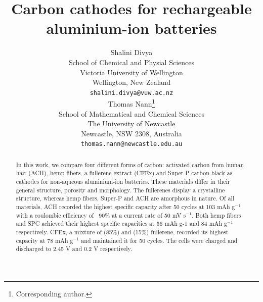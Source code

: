 \documentclass{article}
\title{Carbon cathodes for rechargeable aluminium-ion batteries}
\author{
  Shalini Divya\\
  School of Chemical and Physial Sciences\\
  Victoria University of Wellington\\
  Wellington, New Zealand\\
  \texttt{shalini.divya@vuw.ac.nz}\\
   \And
  Thomas Nann\thanks{Corresponding author.}\\
  School of Mathematical and Chemical Sciences\\
  The University of Newcastle\\
  Newcastle, NSW 2308, Australia\\
  \texttt{thomas.nann@newcastle.edu.au}\\
}
\begin{document}
\maketitle
\begin{abstract}
 In this work, we compare four different forms of carbon: activated carbon from human hair (ACH), hemp fibers, a fullerene extract (CFEx) and Super-P carbon black as cathodes for non-aqueous aluminium-ion batteries. These materials differ in their general structure, porosity and morphology. The fullerenes display a crystalline structure, whereas hemp fibers, Super-P and ACH are amorphous in nature. Of all materials, ACH recorded the highest specific capacity after 50 cycles at 103 mAh g$^-{^1}$ with a coulombic efficiency of ~90\% at a current rate of 50 mV s$^-{^1}$. Both hemp fibers and SPC achieved their highest specific capacities at 56 mAh g-1 and 84 mAh g$^-{^1}$ respectively. CFEx, a mixture of  (85\%) and  (15\%) fullerene, recorded its highest capacity at 78 mAh g$^-{^1}$ and maintained it for 50 cycles. The cells were charged and discharged to 2.45 V and 0.2 V respectively. \end{abstract}
\end{document}
